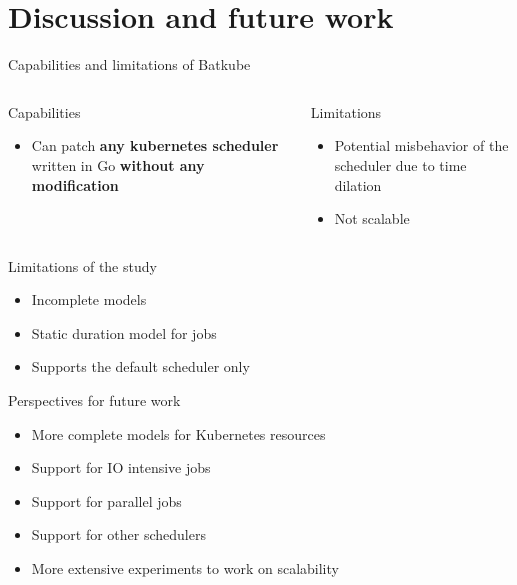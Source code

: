 \documentclass[12pt, aspectratio=43]{beamer}
\begin{document}
\section{Discussion and future work}
\begin{frame}{Capabilities and limitations of Batkube}
	\begin{columns}
		\begin{block}{Capabilities}
			\begin{itemize}
				\item Can patch \textbf{any kubernetes scheduler } written in Go \textbf{without any modification}
			\end{itemize}
		\end{block}

		\begin{alertblock}{Limitations}
			\begin{itemize}
				\item Potential misbehavior of the scheduler
					due to time dilation
				\item Not scalable
			\end{itemize}
		\end{alertblock}
	\end{columns}

	\begin{exampleblock}{Limitations of the study}
		\begin{itemize}
			\item Incomplete models
			\item Static duration model for jobs
			\item Supports the default scheduler only
		\end{itemize}
	\end{exampleblock}
\end{frame}

\begin{frame}{Perspectives for future work}
	\begin{itemize}
		\item More complete models for Kubernetes resources
		\item Support for IO intensive jobs
		\item Support for parallel jobs
		\item Support for other schedulers
		\item More extensive experiments to work on scalability
	\end{itemize}
\end{frame}
\end{document}
